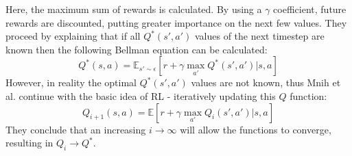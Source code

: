 Here, the maximum sum of rewards is calculated. By using a $\gamma$ coefficient, future rewards are discounted, putting greater importance on the next few values. They proceed by explaining that if all $Q^*(s',a')$ values of the next timestep are known then the following Bellman equation can be calculated:
\begin{equation}\label{opt_qvalue}
    Q^*(s,a) = \mathbb{E}_{s'\sim \epsilon} \left[ r + \gamma \max_{a'} Q^*(s',a') | s,a \right]
\end{equation}
However, in reality the optimal $Q^*(s',a')$ values are not known, thus Mnih et al. continue with the basic idea of RL - iteratively updating this $Q$ function:
\begin{equation}\label{qvalue_i}
    Q_{i+1}(s,a)= \mathbb{E} \left[ r + \gamma \max_{a'} Q_i(s',a') | s,a \right]
\end{equation}
They conclude that an increasing $i\rightarrow \infty$ will allow the functions to converge, resulting in $Q_i\rightarrow Q^*$.

